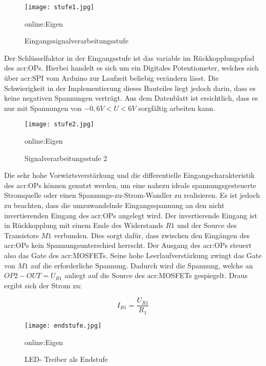 \begin{figure}[H]
	\centering
	\texttt{[image: stufe1.jpg]}
	\caption[Eingangssignalverarbeitungsstufe]{Eingangssignalverarbeitungsstufe} \gls{online:Eigen}
	\label{fig:stufe1}
\end{figure}

Der Schlüsselfaktor in der Eingangsstufe ist das variable im Rückkopplungspfad des \gls{acr:OP}s. Hierbei handelt es sich um ein Digitales Potentiometer, welches sich über \gls{acr:SPI} vom Arduino zur Laufzeit beliebig verändern lässt. Die Schwierigkeit in der Implementierung dieses Bauteiles liegt jedoch darin, dass es keine negativen Spannungen verträgt. Aus dem Datenblatt ist ersichtlich, dass es nur mit Spannungen von $-0,6V<U<6V$ sorgfältig arbeiten kann. 

\begin{figure}[H]
	\centering
	\texttt{[image: stufe2.jpg]}
	\caption[Signalverarbeitungsstufe 2]{Signalverarbeitungsstufe 2} \gls{online:Eigen}
	\label{fig:stufe2}
\end{figure}


Die sehr hohe Vorwärtsverstärkung und die differentielle Eingangscharakteristik des \gls{acr:OP}s können genutzt werden, um eine nahezu ideale spannungsgesteuerte Stromquelle oder einen Spannungs-zu-Strom-Wandler zu realisieren. Es ist jedoch zu beachten, dass die umzuwandelnde Eingangsspannung an den nicht invertierenden Eingang des \gls{acr:OP}s angelegt wird. Der invertierende Eingang ist in Rückkopplung mit einem Ende des Widerstands $R{1}$ und der Source des Transistors $M{1}$ verbunden. Dies sorgt dafür, dass zwischen den Eingängen des \gls{acr:OP}s kein Spannungsunterschied herrscht. Der Ausgang des \gls{acr:OP}s steuert also das Gate des \gls{acr:MOSFET}s. Seine hohe Leerlaufverstärkung zwingt das Gate von $M{1}$ auf die erforderliche Spannung. Dadurch wird die Spannung, welche an $OP2-OUT = U_{R1}$ anliegt auf die Source des \gls{acr:MOSFET}s gespiegelt. Draus ergibt sich der Strom zu: 

\begin{equation}
	\label{equ:bsp1}
	I_{R1} = \frac{U_{R1}}{R_{1}}
\end{equation}

\begin{figure}[H]
	\centering
	\texttt{[image: endstufe.jpg]}
	\caption[LED- Treiber als Endstufe]{LED- Treiber als Endstufe} \gls{online:Eigen}
	\label{fig:endstufe}
\end{figure}

